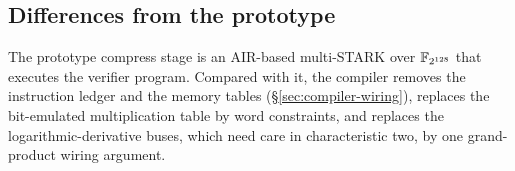 \subsection{Differences from the prototype}

The prototype compress stage is an AIR-based multi-STARK over $\mathbb{F}_{2^{128}}$ that executes the verifier program. Compared with it, the compiler removes the instruction ledger and the memory tables (\S\ref{sec:compiler-wiring}), replaces the bit-emulated \KB{} multiplication table by word \MUL{} constraints, and replaces the logarithmic-derivative buses, which need care in characteristic two, by one grand-product wiring argument.
